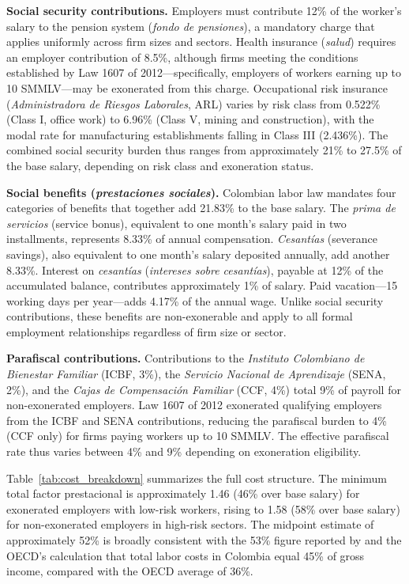 \documentclass{article}
\begin{document}
\textbf{Social security contributions.} Employers must contribute 12\% of the worker's salary to the pension system (\textit{fondo de pensiones}), a mandatory charge that applies uniformly across firm sizes and sectors. Health insurance (\textit{salud}) requires an employer contribution of 8.5\%, although firms meeting the conditions established by Law 1607 of 2012---specifically, employers of workers earning up to 10 SMMLV---may be exonerated from this charge. Occupational risk insurance (\textit{Administradora de Riesgos Laborales}, ARL) varies by risk class from 0.522\% (Class I, office work) to 6.96\% (Class V, mining and construction), with the modal rate for manufacturing establishments falling in Class III (2.436\%). The combined social security burden thus ranges from approximately 21\% to 27.5\% of the base salary, depending on risk class and exoneration status.

\textbf{Social benefits (\textit{prestaciones sociales}).} Colombian labor law mandates four categories of benefits that together add 21.83\% to the base salary. The \textit{prima de servicios} (service bonus), equivalent to one month's salary paid in two installments, represents 8.33\% of annual compensation. \textit{Cesant\'ias} (severance savings), also equivalent to one month's salary deposited annually, add another 8.33\%. Interest on \textit{cesant\'ias} (\textit{intereses sobre cesant\'ias}), payable at 12\% of the accumulated balance, contributes approximately 1\% of salary. Paid vacation---15 working days per year---adds 4.17\% of the annual wage. Unlike social security contributions, these benefits are non-exonerable and apply to all formal employment relationships regardless of firm size or sector.

\textbf{Parafiscal contributions.} Contributions to the \textit{Instituto Colombiano de Bienestar Familiar} (ICBF, 3\%), the \textit{Servicio Nacional de Aprendizaje} (SENA, 2\%), and the \textit{Cajas de Compensaci\'on Familiar} (CCF, 4\%) total 9\% of payroll for non-exonerated employers. Law 1607 of 2012 exonerated qualifying employers from the ICBF and SENA contributions, reducing the parafiscal burden to 4\% (CCF only) for firms paying workers up to 10 SMMLV. The effective parafiscal rate thus varies between 4\% and 9\% depending on exoneration eligibility.

Table~\ref{tab:cost_breakdown} summarizes the full cost structure. The minimum total factor prestacional is approximately 1.46 (46\% over base salary) for exonerated employers with low-risk workers, rising to 1.58 (58\% over base salary) for non-exonerated employers in high-risk sectors. The midpoint estimate of approximately 52\% is broadly consistent with the 53\% figure reported by \cite{anif2018} and the OECD's calculation that total labor costs in Colombia equal 45\% of gross income, compared with the OECD average of 36\%.
\end{document}
